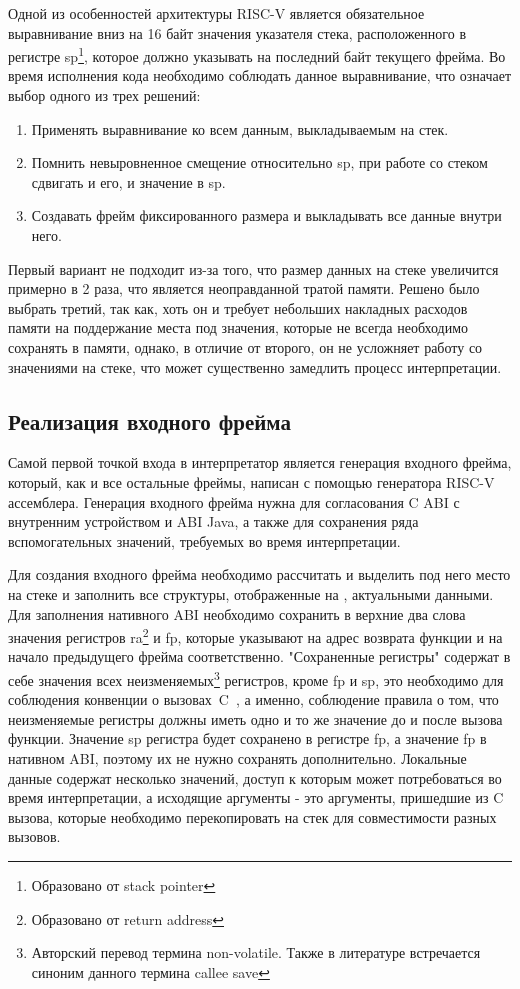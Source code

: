     Одной из особенностей архитектуры RISC-V является обязательное выравнивание вниз на 16 байт значения указателя стека, расположенного в регистре sp\footnote{Образовано от stack pointer}, которое должно указывать на последний байт текущего фрейма. Во время исполнения кода необходимо соблюдать данное выравнивание, что означает выбор одного из трех решений:
\begin{enumerate}
    \item Применять выравнивание ко всем данным, выкладываемым на стек.
    \item Помнить невыровненное смещение относительно sp, при работе со стеком сдвигать и его, и значение в sp.
    \item Создавать фрейм фиксированного размера и выкладывать все данные внутри него.
\end{enumerate}

Первый вариант не подходит из-за того, что размер данных на стеке увеличится примерно в 2 раза, что является неоправданной тратой памяти. Решено было выбрать третий, так как, хоть он и требует небольших накладных расходов памяти на поддержание места под значения, которые не всегда необходимо сохранять в памяти, однако, в отличие от второго, он не усложняет работу со значениями на стеке, что может существенно замедлить процесс интерпретации.

\subsection{Реализация входного фрейма}

Самой первой точкой входа в интерпретатор является генерация входного фрейма, который, как и все остальные фреймы, написан с помощью генератора RISC-V ассемблера. Генерация входного фрейма нужна для согласования C ABI с внутренним устройством и ABI Java, а также для сохранения ряда вспомогательных значений, требуемых во время интерпретации.

Для создания входного фрейма необходимо рассчитать и выделить под него место на стеке и заполнить все структуры, отображенные на , актуальными данными. Для заполнения нативного ABI необходимо сохранить в верхние два слова значения регистров ra\footnote{Образовано от return address} и fp, которые указывают на адрес возврата функции и на начало предыдущего фрейма соответственно. "Сохраненные регистры" содержат в себе значения всех неизменяемых\footnote{Авторский перевод термина non-volatile. Также в литературе встречается синоним данного термина callee save} регистров, кроме fp и sp, это необходимо для соблюдения конвенции о вызовах~C~\cite{riscv:convention}, а именно, соблюдение правила о том, что неизменяемые регистры должны иметь одно и то же значение до и после вызова функции. Значение sp регистра будет сохранено в регистре fp, а значение fp в нативном ABI, поэтому их не нужно сохранять дополнительно. Локальные данные содержат несколько значений, доступ к которым может потребоваться во время интерпретации, а исходящие аргументы - это аргументы, пришедшие из C вызова, которые необходимо перекопировать на стек для совместимости разных вызовов.
 

